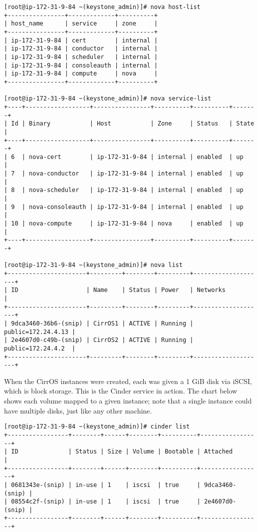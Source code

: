 \begin{verbatim}
[root@ip-172-31-9-84 ~(keystone_admin)]# nova host-list
+----------------+-------------+----------+
| host_name      | service     | zone     |
+----------------+-------------+----------+
| ip-172-31-9-84 | cert        | internal |
| ip-172-31-9-84 | conductor   | internal |
| ip-172-31-9-84 | scheduler   | internal |
| ip-172-31-9-84 | consoleauth | internal |
| ip-172-31-9-84 | compute     | nova     |
+----------------+-------------+----------+

[root@ip-172-31-9-84 ~(keystone_admin)]# nova service-list
+----+------------------+----------------+----------+----------+-------+
| Id | Binary           | Host           | Zone     | Status   | State |
+----+------------------+----------------+----------+----------+-------+
| 6  | nova-cert        | ip-172-31-9-84 | internal | enabled  | up    |
| 7  | nova-conductor   | ip-172-31-9-84 | internal | enabled  | up    |
| 8  | nova-scheduler   | ip-172-31-9-84 | internal | enabled  | up    |
| 9  | nova-consoleauth | ip-172-31-9-84 | internal | enabled  | up    |
| 10 | nova-compute     | ip-172-31-9-84 | nova     | enabled  | up    |
+----+------------------+----------------+----------+----------+-------+

[root@ip-172-31-9-84 ~(keystone_admin)]# nova list
+----------------------+---------+--------+---------+--------------------+
| ID                   | Name    | Status | Power   | Networks           |
+----------------------+---------+--------+---------+--------------------+
| 9dca3460-36b6-(snip) | CirrOS1 | ACTIVE | Running | public=172.24.4.13 |
| 2e4607d0-c49b-(snip) | CirrOS2 | ACTIVE | Running | public=172.24.4.2  |
+----------------------+---------+--------+---------+--------------------+
\end{verbatim}

When the CirrOS instances were created, each was given a 1 GiB disk via iSCSI,
which is block storage. This is the Cinder service in action. The chart below
shows each volume mapped to a given instance; note that a single instance
could have multiple disks, just like any other machine.

\begin{verbatim}
[root@ip-172-31-9-84 ~(keystone_admin)]# cinder list
+-----------------+--------+------+--------+----------+-----------------+
| ID              | Status | Size | Volume | Bootable | Attached        |
+-----------------+--------+------+--------+----------+-----------------+
| 0681343e-(snip) | in-use | 1    | iscsi  | true     | 9dca3460-(snip) |
| 08554c2f-(snip) | in-use | 1    | iscsi  | true     | 2e4607d0-(snip) |
+-----------------+--------+------+--------+----------+-----------------+
\end{verbatim}

